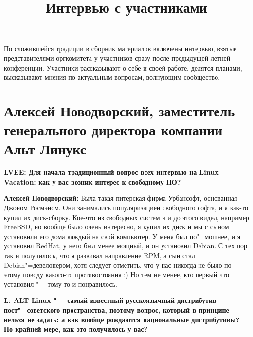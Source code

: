 \documentclass[10pt, a5paper]{article}
\begin{document}
\title{Интервью с участниками}
\date{}
\maketitle

По сложившейся традиции в сборник материалов включены интервью, взятые представителями оргкомитета у участников сразу после предыдущей летней конференции. Участники рассказывают о себе и своей работе, делятся планами, высказывают мнения по актуальным вопросам, волнующим сообщество. 

\section[Алексей Новодворский, Москва, РФ]{Алексей Новодворский, заместитель генерального директора компании Альт Линукс}


{\noindent \bf LVEE: Для начала традиционный вопрос всех интервью на Linux Vacation: как у вас возник интерес к свободному ПО?}

{\noindent \bf Алексей Новодворский:}  Была такая питерская фирма Урбансофт, основанная Джоном Росмэном. Они занимались популяризацией свободного софта, и я как-то купил их диск-сборку. Кое-что из свободных систем я и до этого видел, например FreeBSD, но вообще было очень интересно, я купил их диск и мы с сыном установили его дома каждый на свой компьютер. У меня был по"=мощнее, и я установил RedHat,  у него был менее мощный, и он установил Debian. С тех пор так и получилось, что  я развивал направление  RPM, а сын стал Debian"=девелопером, хотя следует отметить, что у нас никогда не было по этому поводу какого-то противостояния :)  Но тем не менее, кто первый что установил "--- тому то и понравилось. 

{\noindent \bf L: ALT Linux "--- самый известный русскоязычный дистрибутив пост"=советского пространства, поэтому вопрос, который в принципе нельзя не задать: а как вообще рождаются национальные дистрибутивы? По крайней мере, как это получилось у вас?}
\end{document}
